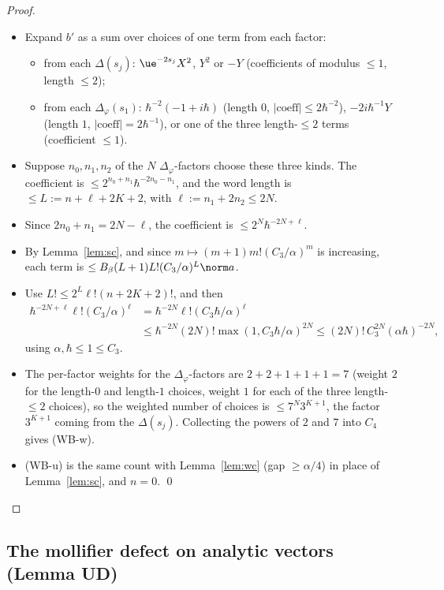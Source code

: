 \begin{proof}
\begin{itemize}
\item Expand $b'$ as a sum over choices of one term from each factor:
  \begin{itemize}
  \item from each $\Delta(s_j)$: $\ue^{-2s_j}X^2$, $Y^2$ or $-Y$ (coefficients of modulus $\le1$, length $\le2$);
  \item from each $\Delta_\varphi(s_1)$: $\hbar^{-2}(-1+i\hbar)$ (length $0$, $|\text{coeff}|\le2\hbar^{-2}$), $-2i\hbar^{-1}Y$ (length $1$, $|\text{coeff}|=2\hbar^{-1}$), or one of the three length-$\le2$ terms (coefficient $\le1$).
  \end{itemize}
\item Suppose $n_0,n_1,n_2$ of the $N$ $\Delta_\varphi$-factors choose these three kinds. The coefficient is $\le2^{n_0+n_1}\hbar^{-2n_0-n_1}$, and the word length is $\le L:=n+\ell+2K+2$, with $\ell:=n_1+2n_2\le2N$.
\item Since $2n_0+n_1=2N-\ell$, the coefficient is $\le2^N\hbar^{-2N+\ell}$.
\item By Lemma~\ref{lem:sc}, and since $m\mapsto(m+1)m!(C_3/\alpha)^m$ is increasing, each term is $\le B_\beta(L+1)L!(C_3/\alpha)^L\norm a$.
\item Use $L!\le2^L\ell!(n+2K+2)!$, and then
\[
\begin{aligned}
\hbar^{-2N+\ell}\ell!(C_3/\alpha)^\ell&=\hbar^{-2N}\ell!(C_3\hbar/\alpha)^\ell\\
&\le\hbar^{-2N}(2N)!\max(1,C_3\hbar/\alpha)^{2N}\le(2N)!\,C_3^{2N}(\alpha\hbar)^{-2N},
\end{aligned}
\]
using $\alpha,\hbar\le1\le C_3$.
\item The per-factor weights for the $\Delta_\varphi$-factors are $2+2+1+1+1=7$ (weight $2$ for the length-$0$ and length-$1$ choices, weight $1$ for each of the three length-$\le2$ choices), so the weighted number of choices is $\le7^N3^{K+1}$, the factor $3^{K+1}$ coming from the $\Delta(s_j)$. Collecting the powers of $2$ and $7$ into $C_4$ gives (WB-w).
\item (WB-u) is the same count with Lemma~\ref{lem:wc} (gap $\ge\alpha/4$) in place of Lemma~\ref{lem:sc}, and $n=0$. \qed
\end{itemize}
\end{proof}

\subsection{The mollifier defect on analytic vectors (Lemma UD)}\label{subsec:dd-unw}

